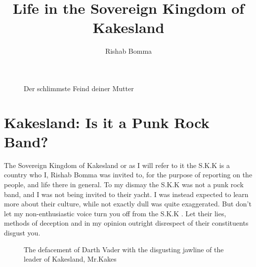 \documentclass[fleqn]{article}
\title{Life in the Sovereign Kingdom of Kakesland}
\author{Rishab Bomma}
\newcommand{\FIG}[2]{
 \begin{figure}[!hbt]
 \begin{center}
 \begin{minipage}{0.85\textwidth}
 \centering{\texttt{[image: \#1]}}
 \caption{\label{#1}\small{#2}}
 \end{minipage}
 \end{center}
 \end{figure}
 }
\newcommand{\3}{\vspace*{3mm}}
\newcommand{\Kakes}{S.K.K \hspace*{.15mm}}
\begin{document}
 \maketitle
  \FIG{INTRO}{Der schlimmste Feind deiner Mutter}
\newpage
{}

\section*{Kakesland: Is it a Punk Rock Band?}



\hspace*{3mm}The Sovereign Kingdom of Kakesland or as I will refer to it the \Kakes is a country who I, Rishab Bomma was invited to, for the purpose of reporting on the people, and life there in general. To my dismay the \Kakes was not a punk rock band, and I was not being invited to their yacht. I was instead expected to learn more about their culture, while not exactly dull was quite exaggerated. But don't let my non-enthusiastic voice turn you off from the \Kakes. Let their lies, methods of deception and in my opinion outright disrespect of their constituents disgust you.

\3

\3

 \begin{figure}[!hbt]
 \begin{center}
 \begin{minipage}{0.85\textwidth}
 \caption{\label{MIDDLE}\small{The defacement of Darth Vader with the disgusting jawline of the leader of Kakesland, Mr.Kakes }}
 \end{minipage}
 \end{center}
 \end{figure}
\end{document}
